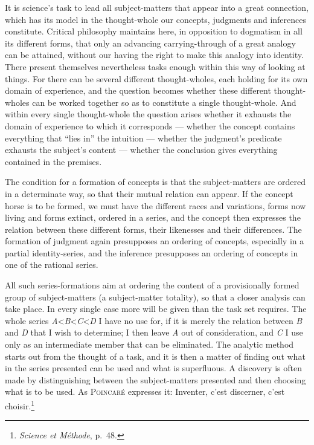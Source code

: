 \documentclass[12pt]{book}
\begin{document}
It is science's task to lead all subject-matters that appear into a great
connection, which has its model in the thought-whole our concepts, judgments and
inferences constitute. Critical philosophy maintains here, in opposition to
dogmatism in all its different forms, that only an advancing carrying-through of
a great analogy can be attained, without our having the right to make this
analogy into identity. There present themselves nevertheless tasks enough within
this way of looking at things. For there can be several different thought-wholes,
each holding for its own domain of experience, and the question becomes whether
these different thought-wholes can be worked together so as to constitute a
single thought-whole. And within every single thought-whole the question arises
whether it exhausts the domain of experience to which it corresponds --- whether
the concept contains everything that ``lies in'' the intuition --- whether the
judgment's predicate exhausts the subject's content --- whether the conclusion
gives everything contained in the premises.

The condition for a formation of concepts is that the subject-matters are ordered
in a determinate way, so that their mutual relation can appear. If the concept
horse is to be formed, we must have the different races and variations, forms now
living and forms extinct, ordered in a series, and the concept then expresses the
relation between these different forms, their likenesses and their differences.
The formation of judgment again presupposes an ordering of concepts, especially
in a partial identity-series, and the inference presupposes an ordering of
concepts in one of the rational series.

All such series-formations aim at ordering the content of a provisionally formed
group of subject-matters (a subject-matter totality), so that a closer analysis
can take place. In every single case more will be given than the task set
requires. The whole series \textit{A}<\textit{B}<\textit{C}<\textit{D} I have no
use for, if it is merely the relation between \textit{B} and \textit{D} that I
wish to determine; I then leave \textit{A} out of consideration, and \textit{C} I
use only as an intermediate member that can be eliminated. The analytic method
starts out from the thought of a task, and it is then a matter of finding out
what in the series presented can be used and what is superfluous. A discovery is
often made by distinguishing between the subject-matters presented and then
choosing what is to be used. As \textsc{Poincaré} expresses it: Inventer, c'est
discerner, c'est choisir.\footnote{\textit{Science et Méthode}, p.\ 48.}
\end{document}
